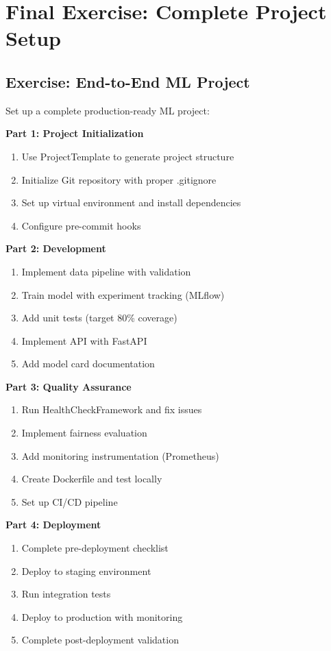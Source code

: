 \section{Final Exercise: Complete Project Setup}

\subsection{Exercise: End-to-End ML Project}

Set up a complete production-ready ML project:

\textbf{Part 1: Project Initialization}
\begin{enumerate}
    \item Use ProjectTemplate to generate project structure
    \item Initialize Git repository with proper .gitignore
    \item Set up virtual environment and install dependencies
    \item Configure pre-commit hooks
\end{enumerate}

\textbf{Part 2: Development}
\begin{enumerate}
    \item Implement data pipeline with validation
    \item Train model with experiment tracking (MLflow)
    \item Add unit tests (target 80\% coverage)
    \item Implement API with FastAPI
    \item Add model card documentation
\end{enumerate}

\textbf{Part 3: Quality Assurance}
\begin{enumerate}
    \item Run HealthCheckFramework and fix issues
    \item Implement fairness evaluation
    \item Add monitoring instrumentation (Prometheus)
    \item Create Dockerfile and test locally
    \item Set up CI/CD pipeline
\end{enumerate}

\textbf{Part 4: Deployment}
\begin{enumerate}
    \item Complete pre-deployment checklist
    \item Deploy to staging environment
    \item Run integration tests
    \item Deploy to production with monitoring
    \item Complete post-deployment validation
\end{enumerate}

